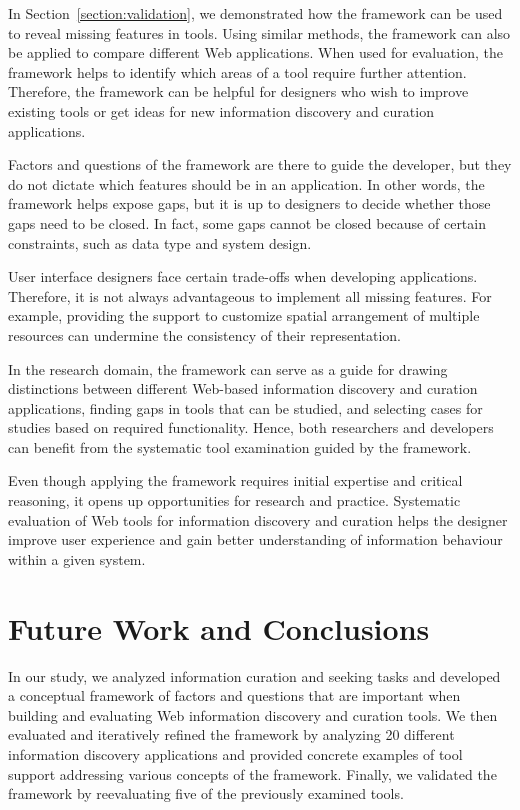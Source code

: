 \documentclass{sigchi}
\begin{document}
{{In Section~\ref{section:validation}, we demonstrated how the framework can be used to reveal missing features in tools. Using similar methods, the framework can also be applied to compare different Web applications. When used for evaluation, the framework helps to identify which areas of a tool require further attention. Therefore, the framework can be helpful for designers who wish to improve existing tools or get ideas for new information discovery and curation applications. 

Factors and questions of the framework are there to guide the developer, but they do not dictate which features should be in an application. In other words, the framework helps expose gaps, but it is up to designers to decide whether those gaps need to be closed. In fact, some gaps cannot be closed because of certain constraints, such as data type and system design.

User interface designers face certain trade-offs when developing applications. Therefore, it is not always advantageous to implement all missing features. For example, providing the support to customize spatial arrangement of multiple resources can undermine the consistency of their representation. 

In the research domain, the framework can serve as a guide for drawing distinctions between different Web-based information discovery and curation applications, finding gaps in tools that can be studied, and selecting cases for studies based on required functionality. Hence, both researchers and developers can benefit from the systematic tool examination guided by the framework.

Even though applying the framework requires initial expertise and critical reasoning, it opens up opportunities for research and practice. Systematic evaluation of Web tools for information discovery and curation helps the designer improve user experience and gain better understanding of information behaviour within a given system. 

\section{Future Work and Conclusions}
\label{section:future_work}
In our study, we analyzed information curation and seeking tasks and developed a conceptual framework of factors and questions that are important when building and evaluating Web information discovery and curation tools. We then evaluated and iteratively refined the framework by analyzing 20 different information discovery applications and provided concrete examples of tool support addressing various concepts of the framework. Finally, we validated the framework by reevaluating five of the previously examined tools.

}}
\end{document}
